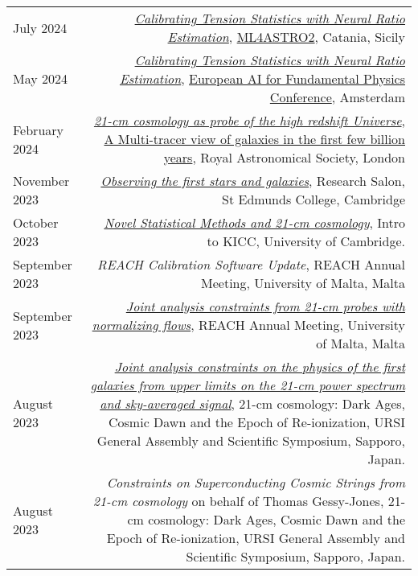 \documentclass{article}
\begin{document}
\begin{tabular}{L!{\vrule}R}
    July 2024 & \textit{\href{https://github.com/htjb/Talks/raw/master/Talks/ML4ASTRO-Tensionnets/tensions.pdf}{Calibrating Tension Statistics with Neural Ratio Estimation}}, \href{https://indico.ict.inaf.it/event/2690/}{ML4ASTRO2}, Catania, Sicily \\
    May 2024 & \textit{\href{https://github.com/htjb/Talks/raw/master/Talks/Amsterdam-EuCAIF-2024/tensions.pdf}{Calibrating Tension Statistics with Neural Ratio Estimation}}, \href{https://indico.nikhef.nl/event/4875/}{European AI for Fundamental Physics Conference}, Amsterdam \\
    February 2024 & \textit{\href{https://github.com/htjb/Talks/raw/master/Talks/RAS_Multi-tracer_View/21cmCosmo.pdf}{21-cm cosmology as probe of the high redshift Universe}}, \href{https://ras.ac.uk/events-and-meetings/ras-meetings/multi-tracer-view-galaxies-first-few-billion-years}{A Multi-tracer view of galaxies in the first few billion years}, Royal Astronomical Society, London \\
    November 2023 & \textit{\href{https://github.com/htjb/Talks/raw/master/Talks/St_Edmunds_Research_Salon_Nov_2023/research_salon.pdf}{Observing the first stars and galaxies}}, Research Salon, St Edmunds College, Cambridge \\
    October 2023 & \textit{\href{https://github.com/htjb/Talks/raw/master/Talks/KICC_Intro_23/kicc_intro_23.pdf}{Novel Statistical Methods and 21-cm cosmology}}, Intro to KICC, University of Cambridge. \\
    September 2023 & \textit{REACH Calibration Software Update}, REACH Annual Meeting, University of Malta, Malta \\
    September 2023 & \textit{\href{https://github.com/htjb/Talks/tree/master/Talks/REACH_Malta/joint_analysis_margarine.pdf}{Joint analysis constraints from 21-cm probes with normalizing flows}}, REACH Annual Meeting, University of Malta, Malta \\
    August 2023 & \href{https://github.com/htjb/Talks/raw/master/Talks/URSI_2023/joint_analysis_margarine.pdf}{\textit{Joint analysis constraints on the physics of the first galaxies from upper limits on the 21-cm power spectrum and sky-averaged signal}}, 21-cm cosmology: Dark Ages, Cosmic Dawn and the Epoch of Re-ionization, URSI General Assembly and Scientific Symposium, Sapporo, Japan. \\
    August 2023 & \textit{Constraints on Superconducting Cosmic Strings from 21-cm cosmology} on behalf of Thomas Gessy-Jones, 21-cm cosmology: Dark Ages, Cosmic Dawn and the Epoch of Re-ionization, URSI General Assembly and Scientific Symposium, Sapporo, Japan. \\

\end{tabular}
\end{document}
